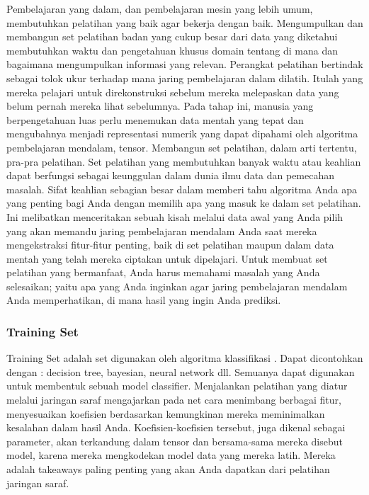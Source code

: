 Pembelajaran yang dalam, dan pembelajaran mesin yang lebih umum, membutuhkan pelatihan yang baik agar bekerja dengan baik. Mengumpulkan dan membangun set pelatihan  badan yang cukup besar dari data yang diketahui  membutuhkan waktu dan pengetahuan khusus domain tentang di mana dan bagaimana mengumpulkan informasi yang relevan. Perangkat pelatihan bertindak sebagai tolok ukur terhadap mana jaring pembelajaran dalam dilatih. Itulah yang mereka pelajari untuk direkonstruksi sebelum mereka melepaskan data yang belum pernah mereka lihat sebelumnya. Pada tahap ini, manusia yang berpengetahuan luas perlu menemukan data mentah yang tepat dan mengubahnya menjadi representasi numerik yang dapat dipahami oleh algoritma pembelajaran mendalam, tensor. Membangun set pelatihan, dalam arti tertentu, pra-pra pelatihan. Set pelatihan yang membutuhkan banyak waktu atau keahlian dapat berfungsi sebagai keunggulan dalam dunia ilmu data dan pemecahan masalah. Sifat keahlian sebagian besar dalam memberi tahu algoritma Anda apa yang penting bagi Anda dengan memilih apa yang masuk ke dalam set pelatihan. Ini melibatkan menceritakan sebuah kisah  melalui data awal yang Anda pilih yang akan memandu jaring pembelajaran mendalam Anda saat mereka mengekstraksi fitur-fitur penting, baik di set pelatihan maupun dalam data mentah yang telah mereka ciptakan untuk dipelajari. Untuk membuat set pelatihan yang bermanfaat, Anda harus memahami masalah yang Anda selesaikan; yaitu apa yang Anda inginkan agar jaring pembelajaran mendalam Anda memperhatikan, di mana hasil yang ingin Anda prediksi.


\subsubsection{Training Set}
Training Set adalah set digunakan oleh algoritma klassifikasi . Dapat dicontohkan dengan : decision tree, bayesian, neural network dll. Semuanya dapat digunakan untuk membentuk sebuah model classifier. Menjalankan pelatihan yang diatur melalui jaringan saraf mengajarkan pada net
cara menimbang berbagai fitur, menyesuaikan koefisien berdasarkan kemungkinan mereka meminimalkan kesalahan dalam hasil Anda. Koefisien-koefisien tersebut, juga dikenal sebagai parameter, akan terkandung dalam tensor dan bersama-sama mereka disebut model, karena mereka mengkodekan model data yang mereka latih. Mereka adalah takeaways paling penting yang akan Anda dapatkan dari pelatihan jaringan saraf.


